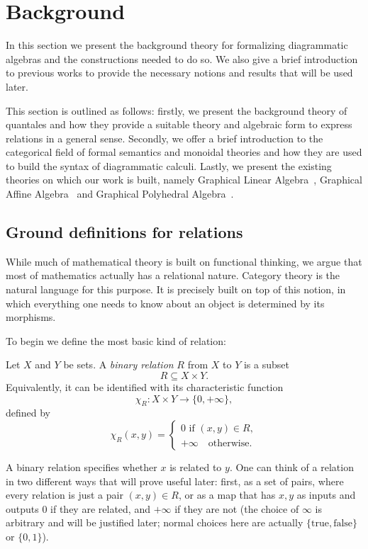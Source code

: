 \section{Background}\label{sec:bg}

In this section we present the background theory for formalizing diagrammatic
algebras and the constructions needed to do so.
We also give a brief introduction to previous works to provide
the necessary notions and results that will be used later.

This section is outlined as follows: firstly, we present the background theory of quantales and
how they provide a suitable theory and algebraic form to express relations in a general sense.
Secondly, we offer a brief introduction to the categorical field of formal semantics and
monoidal theories and how they are used to build the syntax of diagrammatic calculi. Lastly, we
present the existing theories on which our work is built, namely
Graphical Linear Algebra~\cite{paixao2022highlevel, bonchi2017interacting}, Graphical Affine Algebra~\cite{bonchi2019affine} and Graphical Polyhedral Algebra~\cite{bonchi2021polyhedral,bonchi2021.9farkas}.

\subsection{Ground definitions for relations}

While much of mathematical theory is built on functional thinking,
we argue that most of mathematics actually has a relational nature.
Category theory is the natural language for this purpose. It is precisely built on top of this notion,
in which everything one needs to know about an object is determined by its morphisms.

To begin we define the most basic kind of relation:

\begin{definition}
	Let $X$ and $Y$ be sets. A \emph{binary relation} $R$ from $X$ to $Y$ is a subset
	\[
		R \subseteq X \times Y.
	\]
	Equivalently, it can be identified with its characteristic function
	\[
		\chi_R : X \times Y \to \{0,+\infty\},
	\]
	defined by
	\[
		\chi_R(x,y) =
		\begin{cases}
			0  \text{ if } (x,y) \in R, \\
			+\infty \quad \text{otherwise}.
		\end{cases}
	\]
\end{definition}

A binary relation specifies whether $x$ is related to $y$.
One can think of a relation in two different ways that will prove useful later:
first, as a set of pairs, where every relation is just a pair $(x,y) \in R$,
or as a map that has $x,y$ as inputs and outputs $0$ if they are related, and $+\infty$ if they are not
(the choice of $\infty$ is arbitrary and will be justified later; normal choices here are actually $\{\text{true},\text{false}\}$ or $\{0,1\}$).

